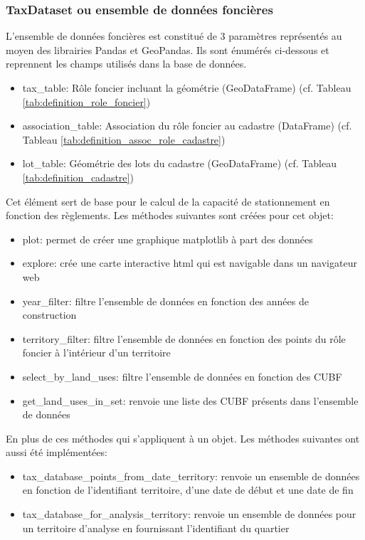         \subsubsection{TaxDataset ou ensemble de données foncières}
        L'ensemble de données foncières est constitué de 3 paramètres représentés au moyen des librairies Pandas et GeoPandas. Ils sont énumérés ci-dessous et reprennent les champs utilisés dans la base de données.
        \begin{itemize}
            \item tax\_table: Rôle foncier incluant la géométrie (GeoDataFrame) (cf. Tableau \ref{tab:definition_role_foncier})
            \item association\_table: Association du rôle foncier au cadastre (DataFrame) (cf. Tableau \ref{tab:definition_assoc_role_cadastre})
            \item lot\_table: Géométrie des lots du cadastre (GeoDataFrame) (cf. Tableau \ref{tab:definition_cadastre})
        \end{itemize}
        Cet élément sert de base pour le calcul de la capacité de stationnement en fonction des règlements. Les méthodes suivantes sont créées pour cet objet: 
        \begin{itemize}
            \item plot: permet de créer une graphique matplotlib à part des données
            \item explore: crée une carte interactive html qui est navigable dans un navigateur web
            \item year\_filter: filtre l'ensemble de données en fonction des années de construction
            \item territory\_filter: filtre l'ensemble de données en fonction des points du rôle foncier à l'intérieur d'un territoire
            \item select\_by\_land\_uses: filtre l'ensemble de données en fonction des \ac{CUBF}
            \item get\_land\_uses\_in\_set: renvoie une liste des \ac{CUBF} présents dans l'ensemble de données
        \end{itemize}
        En plus de ces méthodes qui s'appliquent à un objet. Les méthodes suivantes ont aussi été implémentées:
        \begin{itemize}
            \item tax\_database\_points\_from\_date\_territory: renvoie un ensemble de données en fonction de l'identifiant territoire, d'une date de début et une date de fin
            \item tax\_database\_for\_analysis\_territory: renvoie un ensemble de données pour un territoire d'analyse en fournissant l'identifiant du quartier
        \end{itemize}
        
